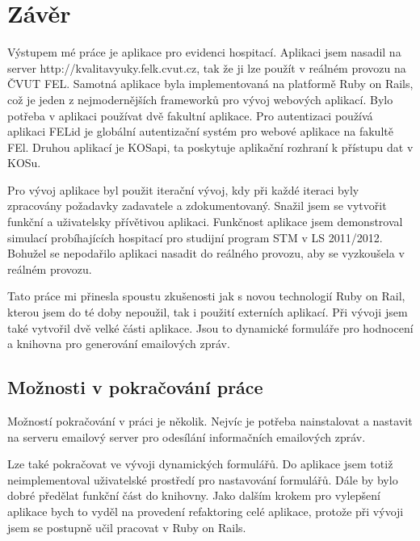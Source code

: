 \chapter{Závěr}

Výstupem mé práce je aplikace pro evidenci hospitací. Aplikaci jsem nasadil na server
http://kvalitavyuky.felk.cvut.cz, tak že ji lze použít v reálném provozu na ČVUT FEL. Samotná aplikace byla implementovaná na platformě Ruby on Rails, což je jeden z nejmodernějších frameworků pro vývoj webových aplikací. Bylo potřeba v aplikaci používat dvě fakultní aplikace. Pro autentizaci používá aplikaci FELid je globální autentizační systém pro webové aplikace na fakultě FEl.  Druhou aplikací je KOSapi, ta poskytuje aplikační rozhraní  k přístupu dat v KOSu.

Pro vývoj aplikace byl použit iterační vývoj, kdy při každé iteraci byly zpracovány požadavky zadavatele a zdokumentovaný. Snažil jsem se vytvořit funkční a uživatelsky přívětivou aplikaci. Funkčnost aplikace jsem demonstroval simulací probíhajících hospitací pro studijní program STM v LS 2011/2012. Bohužel se nepodařilo aplikaci nasadit do reálného provozu, aby se vyzkoušela v reálném provozu.  

Tato práce mi přinesla spoustu zkušenosti jak s novou technologií Ruby on Rail, kterou jsem do té doby nepoužil, tak i použití externích aplikací. Při vývoji jsem také vytvořil dvě velké části aplikace. Jsou to dynamické formuláře pro hodnocení a knihovna pro generování emailových zpráv.

\section{Možnosti v pokračování práce}
Možností pokračování v práci je několik. Nejvíc je potřeba nainstalovat a nastavit na serveru emailový server pro odesílání informačních emailových zpráv.

Lze také pokračovat ve vývoji dynamických formulářů. Do aplikace jsem totiž neimplementoval uživatelské prostředí pro nastavování formulářů. Dále by bylo dobré předělat funkční část do knihovny. Jako dalším krokem pro vylepšení aplikace bych to vyděl na provedení refaktoring celé aplikace, protože při vývoji jsem se postupně učil pracovat v Ruby on Rails.
